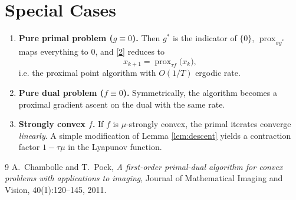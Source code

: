 \documentclass{article}
\newcommand{\prox}{\operatorname{prox}}
\begin{document}
\section*{Special Cases}
\begin{enumerate}
\item \textbf{Pure primal problem ($g\equiv0$).} Then $g^{*}$ is the indicator of $\{0\}$, $\prox_{\sigma g^{*}}$ maps everything to $0$, and \eqref{2} reduces to  
\[
x_{k+1}= \prox_{\tau f}\bigl(x_{k}\bigr),
\]
i.e. the proximal point algorithm with $O(1/T)$ ergodic rate.
\item \textbf{Pure dual problem ($f\equiv0$).} Symmetrically, the algorithm becomes a proximal gradient ascent on the dual with the same rate.
\item \textbf{Strongly convex $f$.} If $f$ is $\mu$‑strongly convex, the primal iterates converge \emph{linearly}. A simple modification of Lemma \ref{lem:descent} yields a contraction factor $1-\tau\mu$ in the Lyapunov function.
\end{enumerate}

\begin{thebibliography}{9}
A.~Chambolle and T.~Pock,
\newblock \emph{A first-order primal-dual algorithm for convex problems with
  applications to imaging},
\newblock Journal of Mathematical Imaging and Vision, 40(1):120--145, 2011.
\end{thebibliography}
\end{document}
